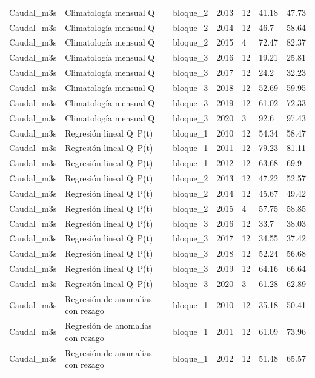 \begin{longtable}{lllllll}
Caudal\_m3s & Climatología mensual Q & bloque\_2 & 2013 & 12 & 41.18 & 47.73 \\
Caudal\_m3s & Climatología mensual Q & bloque\_2 & 2014 & 12 & 46.7 & 58.64 \\
Caudal\_m3s & Climatología mensual Q & bloque\_2 & 2015 & 4 & 72.47 & 82.37 \\
Caudal\_m3s & Climatología mensual Q & bloque\_3 & 2016 & 12 & 19.21 & 25.81 \\
Caudal\_m3s & Climatología mensual Q & bloque\_3 & 2017 & 12 & 24.2 & 32.23 \\
Caudal\_m3s & Climatología mensual Q & bloque\_3 & 2018 & 12 & 52.69 & 59.95 \\
Caudal\_m3s & Climatología mensual Q & bloque\_3 & 2019 & 12 & 61.02 & 72.33 \\
Caudal\_m3s & Climatología mensual Q & bloque\_3 & 2020 & 3 & 92.6 & 97.43 \\
Caudal\_m3s & Regresión lineal Q~P(t) & bloque\_1 & 2010 & 12 & 54.34 & 58.47 \\
Caudal\_m3s & Regresión lineal Q~P(t) & bloque\_1 & 2011 & 12 & 79.23 & 81.11 \\
Caudal\_m3s & Regresión lineal Q~P(t) & bloque\_1 & 2012 & 12 & 63.68 & 69.9 \\
Caudal\_m3s & Regresión lineal Q~P(t) & bloque\_2 & 2013 & 12 & 47.22 & 52.57 \\
Caudal\_m3s & Regresión lineal Q~P(t) & bloque\_2 & 2014 & 12 & 45.67 & 49.42 \\
Caudal\_m3s & Regresión lineal Q~P(t) & bloque\_2 & 2015 & 4 & 57.75 & 58.85 \\
Caudal\_m3s & Regresión lineal Q~P(t) & bloque\_3 & 2016 & 12 & 33.7 & 38.03 \\
Caudal\_m3s & Regresión lineal Q~P(t) & bloque\_3 & 2017 & 12 & 34.55 & 37.42 \\
Caudal\_m3s & Regresión lineal Q~P(t) & bloque\_3 & 2018 & 12 & 52.24 & 56.68 \\
Caudal\_m3s & Regresión lineal Q~P(t) & bloque\_3 & 2019 & 12 & 64.16 & 66.64 \\
Caudal\_m3s & Regresión lineal Q~P(t) & bloque\_3 & 2020 & 3 & 61.28 & 62.89 \\
Caudal\_m3s & Regresión de anomalías con rezago & bloque\_1 & 2010 & 12 & 35.18 & 50.41 \\
Caudal\_m3s & Regresión de anomalías con rezago & bloque\_1 & 2011 & 12 & 61.09 & 73.96 \\
Caudal\_m3s & Regresión de anomalías con rezago & bloque\_1 & 2012 & 12 & 51.48 & 65.57 \\

\end{longtable}
